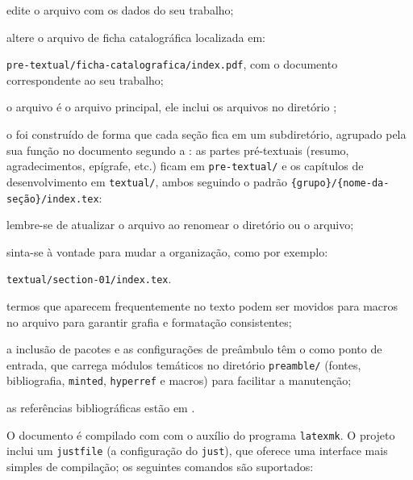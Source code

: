 \begin{alineas}
  \item edite o arquivo  \metadatafile{} com os dados do seu trabalho;

  \item altere o arquivo de ficha catalográfica localizada em:

  \contentdir{}\texttt{pre-textual/ficha-catalografica/index.pdf}, com o documento correspondente ao seu trabalho;

  \item o arquivo \mainfile{} é o arquivo principal, ele inclui os arquivos no diretório \contentdir;

  \item o \template{} foi construído de forma que cada seção fica em um subdiretório, agrupado pela sua função no documento segundo a \abnt: as partes pré-textuais (resumo, agradecimentos, epígrafe, etc.) ficam em \contentdir{}\texttt{pre-textual/} e os capítulos de desenvolvimento em \contentdir{}\texttt{textual/}, ambos seguindo o padrão \contentdir{}\texttt{\{grupo\}/\{nome-da-seção\}/index.tex}:

  \begin{alineas}
    \item lembre-se de atualizar o arquivo \mainfile{} ao renomear o diretório ou o arquivo;

    \item sinta-se à vontade para mudar a organização, como por exemplo:

    \contentdir{}\texttt{textual/section-01/index.tex}.
  \end{alineas}

  \item termos que aparecem frequentemente no texto podem ser movidos para macros no arquivo \macrofile{} para garantir grafia e formatação consistentes;

  \item a inclusão de pacotes e as configurações de preâmbulo têm o \pkgfile{} como ponto de entrada, que carrega módulos temáticos no diretório \texttt{preamble/} (fontes, bibliografia, \texttt{minted}, \texttt{hyperref} e macros) para facilitar a manutenção;

  \item as referências bibliográficas estão em \bibfile.
\end{alineas}

O documento é compilado com \XeLaTeX{} com o auxílio do programa \texttt{latexmk}. O projeto inclui um \texttt{justfile} (a configuração do \texttt{just}), que oferece uma interface mais simples de compilação; os seguintes comandos são suportados:

